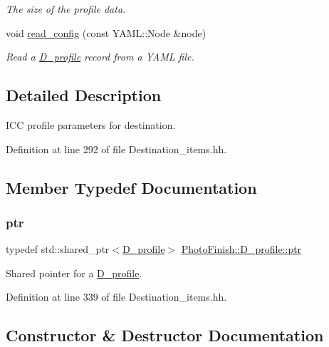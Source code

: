 \begin{DoxyCompactItemize}
\begin{DoxyCompactList}\small\item\em The size of the profile data. \end{DoxyCompactList}\item 
void \hyperlink{class_photo_finish_1_1_d__profile_a47e507f6e2a4ec5a87ac6074bdc9d902}{read\+\_\+config} (const Y\+A\+M\+L\+::\+Node \&node)
\begin{DoxyCompactList}\small\item\em Read a \hyperlink{class_photo_finish_1_1_d__profile}{D\+\_\+profile} record from a Y\+A\+ML file. \end{DoxyCompactList}\end{DoxyCompactItemize}


\subsection{Detailed Description}
I\+CC profile parameters for destination. 

Definition at line 292 of file Destination\+\_\+items.\+hh.



\subsection{Member Typedef Documentation}
\mbox{\label{class_photo_finish_1_1_d__profile_a9711c3571babd1b40709747a63866b38}} 
\subsubsection{\texorpdfstring{ptr}{ptr}}
{\footnotesize\ttfamily typedef std\+::shared\+\_\+ptr$<$\hyperlink{class_photo_finish_1_1_d__profile}{D\+\_\+profile}$>$ \hyperlink{class_photo_finish_1_1_d__profile_a9711c3571babd1b40709747a63866b38}{Photo\+Finish\+::\+D\+\_\+profile\+::ptr}}



Shared pointer for a \hyperlink{class_photo_finish_1_1_d__profile}{D\+\_\+profile}. 



Definition at line 339 of file Destination\+\_\+items.\+hh.



\subsection{Constructor \& Destructor Documentation}
\mbox{\label{class_photo_finish_1_1_d__profile_a5d2c843605849d4fe1a7e142bec84016}} 
